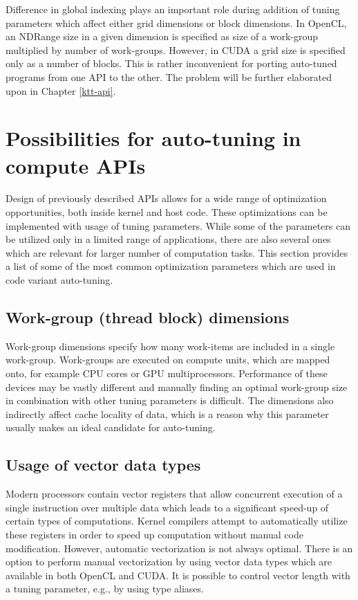 \documentclass
[
    digital, %
    oneside, %
    table, %
    nolof, %
    nolot, %
    nocover %
]{fithesis3}
\begin{document}
Difference in global indexing plays an important role during addition of tuning parameters which affect either grid dimensions or block dimensions.
In OpenCL, an NDRange size in a given dimension is specified as size of a work-group multiplied by number of work-groups. However, in CUDA a grid
size is specified only as a number of blocks. This is rather inconvenient for porting auto-tuned programs from one API to the other. The problem
will be further elaborated upon in Chapter \ref{ktt-api}.

\section{Possibilities for auto-tuning in compute APIs}
Design of previously described APIs allows for a wide range of optimization opportunities, both inside kernel and host code. These optimizations can
be implemented with usage of tuning parameters. While some of the parameters can be utilized only in a limited range of applications, there are also
several ones which are relevant for larger number of computation tasks. This section provides a list of some of the most common optimization parameters
which are used in code variant auto-tuning.

\subsection{Work-group (thread block) dimensions}
Work-group dimensions specify how many work-items are included in a single work-group. Work-groups are executed on compute units, which are mapped
onto, for example CPU cores or GPU multiprocessors. Performance of these devices may be vastly different and manually finding an optimal work-group
size in combination with other tuning parameters is difficult. The dimensions also indirectly affect cache locality of data, which is a reason why
this parameter usually makes an ideal candidate for auto-tuning.

\subsection{Usage of vector data types}
Modern processors contain vector registers that allow concurrent execution of a single instruction over multiple data which leads to a significant
speed-up of certain types of computations. Kernel compilers attempt to automatically utilize these registers in order to speed up computation without
manual code modification. However, automatic vectorization is not always optimal. There is an option to perform manual vectorization by using vector
data types which are available in both OpenCL and CUDA. It is possible to control vector length with a tuning parameter, e.g., by using type aliases.
\end{document}
